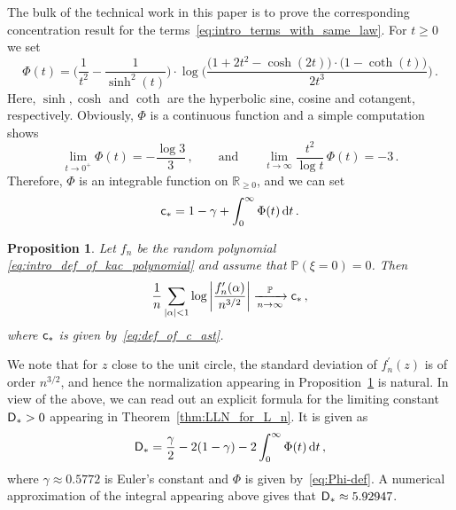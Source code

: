 \documentclass[11pt]{amsart}
\newtheorem{proposition}[theorem]{Proposition}
\theoremstyle{remark}
\theoremstyle{definition}
\newcommand{\bR}{\mathbb R}
\newcommand{\bP}{\mathbb P}
\begin{document}
    The bulk of the technical work in this paper is to prove the corresponding concentration result for the terms~\eqref{eq:intro_terms_with_same_law}. For $t\ge 0$ we set
    \begin{equation}
        \label{eq:Phi-def}
        \Phi(t) = \Big(\frac{1}{t^2} - \frac{1}{\sinh^2(t)}\Big) \cdot \log \bigg( \frac{\big(1+2t^2-\cosh(2t)\big)\cdot \big( 1-\coth(t)\big)}{2t^3} \bigg)  \, .
        \end{equation}
        Here, $\sinh,\cosh$ and $\coth$ are the hyperbolic sine, cosine and cotangent, respectively. Obviously, $\Phi$ is a continuous function  and a simple computation shows
        \[
        \lim_{t\to 0^+} \Phi(t) = -\frac{\log 3}{3} \, , \qquad \text{and} \qquad \lim_{t\to\infty} \frac{t^2}{\log t} \, \Phi(t) = -3 \, . 
        \]
    Therefore, $\Phi$ is an integrable function on $\bR_{\ge 0}$, and we can set
    \begin{equation}
        \label{eq:def_of_c_ast}
        {\sf c}_\ast = 1-\gamma + \int_{0}^\infty \Phi(t) \, {\rm d}t \, .
    \end{equation}
    
    \begin{proposition}\label{prop:sum-concentrated}
        Let $f_n$ be the random polynomial \eqref{eq:intro_def_of_kac_polynomial} and assume that $\bP(\xi = 0 )= 0$.  Then $$ \frac{1}{n} \sum_{|\alpha| < 1} \log \left|\frac{f_n'(\alpha)}{n^{3/2}} \right| \xrightarrow[n\to \infty]{\bP} {\sf c}_\ast \, ,$$
        where ${\sf c}_\ast$ is given by~\eqref{eq:def_of_c_ast}.
    \end{proposition}
    We note that for $z$ close to the unit circle, the standard deviation of $f_n^\prime(z)$ is of order $n^{3/2}$, and hence the normalization appearing in Proposition~\ref{prop:sum-concentrated} is natural. In view of the above, we can read out an explicit formula for the limiting constant ${\sf D}_\ast>0$ appearing in Theorem~\ref{thm:LLN_for_L_n}. It is given as 
    \begin{equation}
	    \label{eq:intro_def_of_D_ast}
        {\sf D}_\ast  = \frac{\gamma}{2} - 2(1-\gamma) - 2\int_{0}^\infty \Phi(t) \, {\rm d}t \, , 
	\end{equation}
    where $\gamma\approx 0.5772$ is Euler's constant and $\Phi$ is given by~\eqref{eq:Phi-def}. A numerical approximation of the integral appearing above gives that ${\sf D}_\ast \approx 5.92947$.
    
\end{document}
